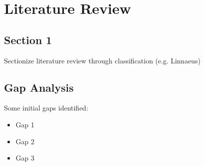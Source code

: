 \chapter{\label{ch2: litreview} Literature Review}
\minitoc
\section{Section 1} 
\label{sec: ch2-section-1}
Sectionize literature review through classification (e.g. Linnaeus)


\section{Gap Analysis}
\label{sec: ch2-Research-gap}
Some initial gaps identified:
\begin{itemize}
    \item Gap 1 
    \item Gap 2
    \item Gap 3
\end{itemize}
